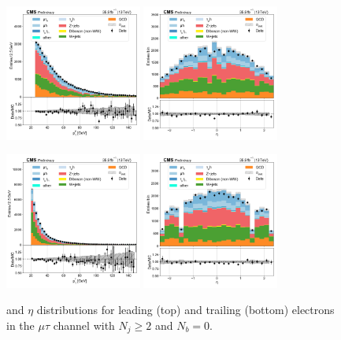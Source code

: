 \begin{figure}[htb!]
    \centering
    \includegraphics[width=0.4\textwidth]{chapters/Analysis/sectionPlots/figures/data_mc_overlays/mutau_2016_cat_gt2_eq0_signal_linear_lepton_lepton1_pt}
    \includegraphics[width=0.4\textwidth]{chapters/Analysis/sectionPlots/figures/data_mc_overlays/mutau_2016_cat_gt2_eq0_signal_linear_lepton_lepton1_eta}

    \includegraphics[width=0.4\textwidth]{chapters/Analysis/sectionPlots/figures/data_mc_overlays/mutau_2016_cat_gt2_eq0_signal_linear_lepton_lepton2_pt}
    \includegraphics[width=0.4\textwidth]{chapters/Analysis/sectionPlots/figures/data_mc_overlays/mutau_2016_cat_gt2_eq0_signal_linear_lepton_lepton2_eta}
    \caption{\pt and $\eta$ distributions for leading (top) and trailing
        (bottom) electrons in the $\mu\tau$ channel with $N_{j} \geq 2$ and
        $N_{b} = 0$.}
    \label{fig:analysis:plots:mutau_4_kinematic}
\end{figure}

